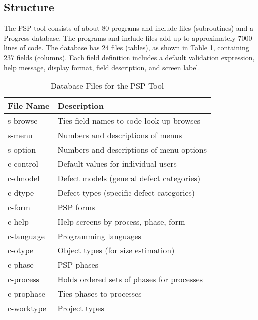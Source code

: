 \subsection{Structure}

The PSP tool consists of about 80 programs and include files (subroutines)
and a Progress database. The programs and include files add up to
approximately 7000 lines of code. The database has 24 files (tables), as
shown in Table \ref{table:pspTables}, containing 237 fields (columns).  Each
field definition includes a default validation expression, help message,
display format, field description, and screen label.

\begin{table} 
\begin{center}
\caption{\label{table:pspTables}Database Files for the PSP Tool} 
\begin{tabular}{|l|l|} \hline 
File Name      & Description                                     \\ \hline\hline 

s-browse       & Ties field names to code look-up browses        \\ \hline
s-menu         & Numbers and descriptions of menus               \\ \hline
s-option       & Numbers and descriptions of menu options        \\ \hline\hline

c-control      & Default values for individual users             \\ \hline
c-dmodel       & Defect models (general defect categories)       \\ \hline
c-dtype        & Defect types (specific defect categories)       \\ \hline
c-form         & PSP forms                                       \\ \hline
c-help         & Help screens by process, phase, form            \\ \hline
c-language     & Programming languages                           \\ \hline
c-otype        & Object types (for size estimation)              \\ \hline
c-phase        & PSP phases                                      \\ \hline
c-process      & Holds ordered sets of phases for processes      \\ \hline
c-prophase     & Ties phases to processes                        \\ \hline
c-worktype     & Project types                                   \\ \hline\hline


\end{tabular}
\end{center}
\end{table}
